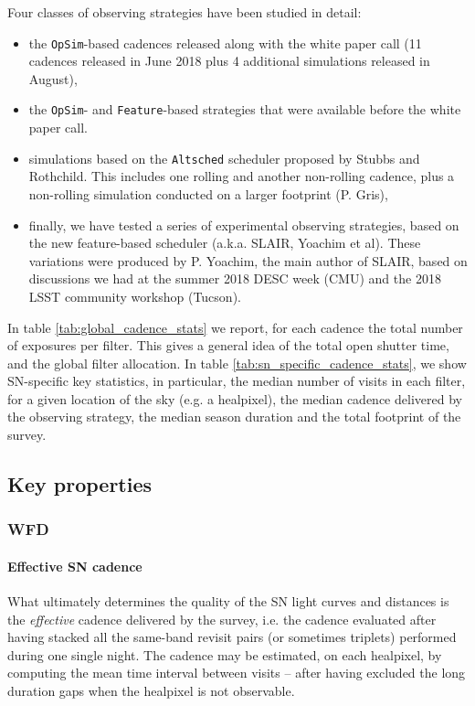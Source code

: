 \documentclass [11pt,a4paper]{article}
\begin{document}
Four classes of observing strategies have been studied in detail:
\begin{itemize}

\item the {\tt OpSim}-based cadences released along with the white
  paper call (11 cadences released in June 2018 plus 4 additional
  simulations released in August), 
  
\item the {\tt OpSim}- and {\tt Feature}-based strategies that were
  available before the white paper call. 

\item simulations based on the {\tt Altsched} scheduler proposed by
  Stubbs and Rothchild.  This includes one rolling and another
  non-rolling cadence, plus a non-rolling simulation conducted on a
  larger footprint (P. Gris),

\item finally, we have tested a series of experimental observing
  strategies, based on the new feature-based scheduler (a.k.a.  SLAIR,
  Yoachim et al). These variations were produced by P. Yoachim, the
  main author of SLAIR, based on discussions we had at the summer 2018
  DESC week (CMU) and the 2018 LSST community workshop (Tucson).
\end{itemize}

In table \ref{tab:global_cadence_stats} we report, for each cadence
the total number of exposures per filter. This gives a general idea of
the total open shutter time, and the global filter allocation.  In
table \ref{tab:sn_specific_cadence_stats}, we show SN-specific key
statistics, in particular, the median number of visits in each filter,
for a given location of the sky (e.g. a healpixel), the median cadence
delivered by the observing strategy, the median season duration and
the total footprint of the survey.


\subsection{Key properties}

\subsubsection {WFD}
\label{sec:wfd_cadence_key_properties}

\paragraph{Effective SN cadence} What ultimately determines the quality of the SN light curves
and distances is the {\em effective} cadence delivered by the survey,
i.e.  the cadence evaluated after having stacked all the same-band
revisit pairs (or sometimes triplets) performed during one single night. The cadence may be estimated, on each
healpixel, by computing the mean time interval between visits -- after
having excluded the long duration gaps when the healpixel is not
observable.
\end{document}
